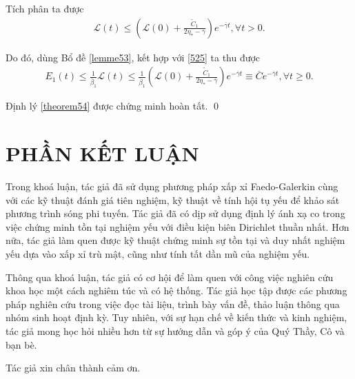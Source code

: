 \documentclass[12pt,a4paper]{article}
\theoremstyle{definition}
\theoremstyle{definition}
\begin{document}
Tích phân ta được
\begin{align} \label{525}
    \mathcal{L}(t) \le \left(\mathcal{L}(0) + \frac{\tilde{C}_1}{2\eta_* - \overline{\gamma}}\right) e^{-\overline{\gamma}t}, \forall t > 0.
\end{align}

Do đó, dùng Bổ đề \ref{lemme53}, kết hợp với \eqref{525} ta thu được
\begin{align}
    E_1(t) \le \frac{1}{\overline{\beta}_1} \mathcal{L}(t)
    \le \frac{1}{\overline{\beta}_1} \left(\mathcal{L}(0) + \frac{\tilde{C}_1}{2\eta_* - \overline{\gamma}}\right) e^{-\overline{\gamma}t}
    \equiv \overline{C} e^{-\overline{\gamma}t}, \forall t \ge 0.
\end{align}

Định lý \ref{theorem54} được chứng minh hoàn tất. \qed
\pagebreak

\section*{PHẦN KẾT LUẬN}

Trong khoá luận, tác giả đã sử dụng phương pháp xấp xỉ Faedo-Galerkin cùng với các kỹ thuật đánh giá tiên nghiệm, kỹ thuật về tính hội tụ yếu để khảo sát phương trình sóng phi tuyến. Tác giả đã có dịp sử dụng định lý ánh xạ co trong việc chứng minh tồn tại nghiệm yếu với điều kiện biên Dirichlet thuần nhất. Hơn nữa, tác giả làm quen được kỹ thuật chứng minh sự tồn tại và duy nhất nghiệm yếu dựa vào xấp xỉ trù mật, cũng như tính tất dần mũ của nghiệm yếu.


Thông qua khoá luận, tác giả có cơ hội để làm quen với công việc nghiên cứu khoa học một cách nghiêm túc và có hệ thống. Tác giả học tập được các phương pháp nghiên cứu trong việc đọc tài liệu, trình bày vấn đề, thảo luận thông qua nhóm sinh hoạt định kỳ. Tuy nhiên, với sự hạn chế về kiến thức và kinh nghiệm, tác giả mong học hỏi nhiều hơn từ sự hướng dẫn và góp ý của Quý Thầy, Cô và bạn bè.


Tác giả xin chân thành cảm ơn.
\newpage

\renewcommand{\refname}{TÀI LIỆU THAM KHẢO}
\end{document}
